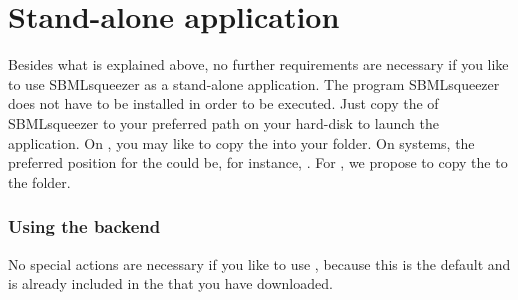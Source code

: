 \section{Stand-alone application}
\label{sec:StandAlone}

Besides what is explained above, no further requirements are necessary if you
like to use SBMLsqueezer as a stand-alone application.
The program SBMLsqueezer does not have to be installed in order to be executed.
Just copy the \JAR of SBMLsqueezer to your preferred path on your hard-disk
to launch the application.
On \MacOSX, you may like to copy the \JAR into your
folder.
On \Windows systems, the preferred position for the \JAR could be, for
instance,
.
For \Linux, we propose to copy the \JAR to the  folder.


\subsubsection{Using the \JSBML backend}

No special actions are necessary if you like to use \JSBML, because this is the
default and \JSBML is already included in the \JAR that you have downloaded.

